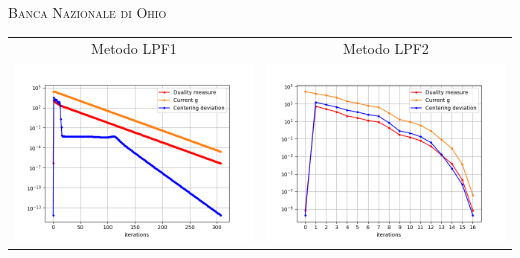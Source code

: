 \begin{frame}{\textsc{\LARGE \textcolor{iris}{Banca Nazionale di Ohio}}}
	\centering
	\begin{tabular}{c@{}c}
		\small{Metodo LPF1} & \small{Metodo LPF2} \\
		\includegraphics[scale = 0.33]{onb_LPF1}
		&\includegraphics[scale = 0.33]{onb_LPF2}\\ 
	\end{tabular}
\end{frame}

